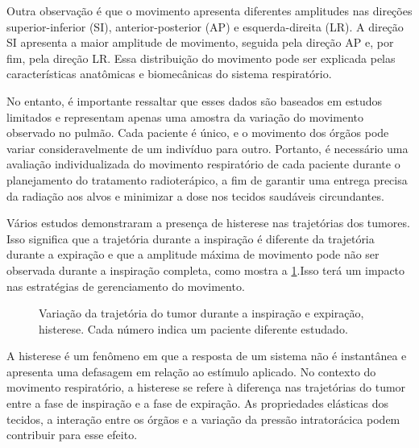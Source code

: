 \documentclass[11pt,a4paper]{article}
\begin{document}
	Outra observação é que o movimento apresenta diferentes amplitudes nas direções superior-inferior (SI), anterior-posterior (AP) e esquerda-direita (LR). A direção SI apresenta a maior amplitude de movimento, seguida pela direção AP e, por fim, pela direção LR. Essa distribuição do movimento pode ser explicada pelas características anatômicas e biomecânicas do sistema respiratório.

	No entanto, é importante ressaltar que esses dados são baseados em estudos limitados e representam apenas uma amostra da variação do movimento observado no pulmão. Cada paciente é único, e o movimento dos órgãos pode variar consideravelmente de um indivíduo para outro. Portanto, é necessário uma avaliação individualizada do movimento respiratório de cada paciente durante o planejamento do tratamento radioterápico, a fim de garantir uma entrega precisa da radiação aos alvos e minimizar a dose nos tecidos saudáveis circundantes.

	Vários estudos demonstraram a presença de histerese nas trajetórias dos tumores. Isso significa que a trajetória durante a inspiração é diferente da trajetória durante a expiração e que a amplitude máxima de movimento pode não ser observada durante a inspiração completa, como mostra a \ref{fig:gmrVariacaoTrajetoriaBronq}.Isso terá um impacto nas estratégias de gerenciamento do movimento.

	\begin{figure}[h]
		\centering
		\caption{Variação da trajetória do tumor durante a inspiração e expiração, histerese. Cada número indica um paciente diferente estudado.}
		\label{fig:gmrVariacaoTrajetoriaBronq}
	\end{figure}

	A histerese é um fenômeno em que a resposta de um sistema não é instantânea e apresenta uma defasagem em relação ao estímulo aplicado. No contexto do movimento respiratório, a histerese se refere à diferença nas trajetórias do tumor entre a fase de inspiração e a fase de expiração. As propriedades elásticas dos tecidos, a interação entre os órgãos e a variação da pressão intratorácica podem contribuir para esse efeito.
\end{document}
